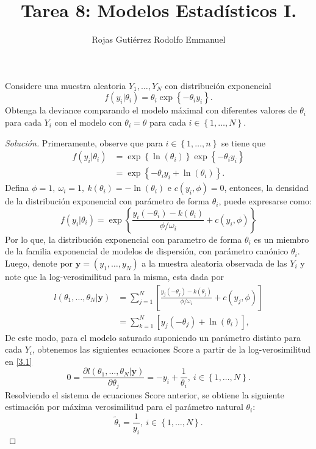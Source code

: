 \documentclass[10.5pt,notitlepage]{article}
\title{Tarea 8: Modelos Estadísticos I.}
\author{Rojas Gutiérrez Rodolfo Emmanuel}
\newenvironment{solucion}
  {\begin{proof}[Solución]}
  {\end{proof}}
\newcommand{\corch}[1]{\left[ #1 \right]}
\newcommand{\kis}[1]{\left\{ #1 \right\}}
\theoremstyle{plain}
\begin{document}
\maketitle

\setcounter{exo}{0}
\begin{exo}\label{Ej.1}
Considere una muestra aleatoria \(Y_1, \hdots, Y_{N}\) con distribución exponencial
\[
f(y_i | \theta_i) = \theta_i\exp\kis{-\theta_i y_i }.
\]
Obtenga la deviance comparando el modelo máximal con diferentes valores de \(\theta_i\) para cada \(Y_i\) con el modelo con \(\theta_i = \theta\) para cada \(i \in \kis{1, \hdots, N}\).
\end{exo} 
\begin{solucion}
Primeramente, observe que para \(i \in \kis{1, \hdots, n}\) se tiene que
\begin{align*}
  f(y_i|\theta_i) &= \exp\kis{\ln(\theta_i)}\exp\kis{-\theta_i y_i}  \\
  &= \exp\kis{-\theta_i y_i + \ln(\theta_i)}. 
\end{align*}
Defina \(\phi = 1,\ \omega_i = 1,\ k(\theta_i) = -\ln(\theta_i)\) e \( c(y_i, \phi) = 0\), entonces, la densidad de la distribución exponencial con parámetro de forma \(\theta_i\), puede expresarse como:
\begin{equation*}
   f(y_i|\theta_i) =\exp\kis{\frac{y_i(-\theta_i) - k(\theta_i)}{\phi/\omega_i}+c(y_i, \phi ) } 
\end{equation*}
Por lo que, la distribución exponencial con parametro de forma \(\theta_i\) es un miembro de la familia exponencial de modelos de dispersión, con parámetro canónico \(\theta_i\). Luego, denote por \(\mathbf{y} = (y_1, \hdots,y_N)\) a la muestra aleatoria observada de las \(Y_i\) y note que la log-verosimilitud para la misma, esta dada por 
\begin{align}\label{3.1}
      l(\theta_1, \hdots,\theta_N|\mathbf{y}) &= \sum_{j=1}^{N}\corch{\frac{y_j(-\theta_j) - k(\theta_j)}{\phi/\omega_i}+c(y_j, \phi )} \nonumber\\ 
      &= \sum_{k=1}^{N}\corch{y_j(-\theta_j) + \ln(\theta_i)},
\end{align}
De este modo, para el modelo saturado suponiendo un parámetro distinto para cada \(Y_i\), obtenemos las siguientes ecuaciones Score a partir de la log-verosimilitud en \eqref{3.1} 
\begin{equation*}
    0= \frac{\partial l(\theta_1, \hdots,\theta_N|\mathbf{y})}{ \partial \theta_j} = -y_i + \frac{1}{\theta_i},\  i \in \kis{1, \hdots, N}.
\end{equation*}
Resolviendo el sistema de ecuaciones Score anterior, se obtiene la siguiente estimación por máxima verosimilitud para el parámetro natural \(\theta_i\): 
\begin{equation}\label{max}
  \tilde{\theta}_i = \frac{1}{y_i},\ i \in \kis{1, \hdots, N}.  
\end{equation}


\end{solucion}
\end{document}
